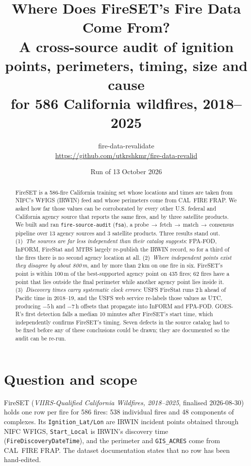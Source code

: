 \documentclass[11pt,a4paper]{article}
\title{\textbf{Where Does FireSET's Fire Data Come From?}\\[4pt]
\large A cross-source audit of ignition points, perimeters, timing, size and cause\\
for 586 California wildfires, 2018--2025}
\author{fire-data-revalidate \\ \small\url{https://github.com/utkrshkmr/fire-data-revalid}}
\date{Run of 13 October 2026}
\begin{document}
\maketitle

\begin{abstract}
\noindent FireSET is a 586-fire California training set whose locations and times are taken from NIFC's WFIGS
(IRWIN) feed and whose perimeters come from CAL~FIRE FRAP. We asked how far those values can be corroborated
by every other U.S. federal and California agency source that reports the same fires, and by three satellite
products. We built and ran \texttt{fire-source-audit} (\texttt{fsa}), a probe\,$\to$\,fetch\,$\to$\,match\,$\to$\,consensus
pipeline over 13 agency sources and 3 satellite products. Three results stand out. (1)~\emph{The sources are
far less independent than their catalog suggests}: FPA-FOD, InFORM, FireStat and MTBS largely re-publish the
IRWIN record, so for a third of the fires there is no second agency location at all. (2)~\emph{Where independent
points exist they disagree by about 800\,m}, and by more than 2\,km on one fire in six. FireSET's point is within
100\,m of the best-supported agency point on 435 fires; 62 fires have a point that lies outside the final
perimeter while another agency point lies inside it. (3)~\emph{Discovery times carry systematic clock errors}:
USFS FireStat runs 2\,h ahead of Pacific time in 2018--19, and the USFS web service re-labels those values as
UTC, producing $-5$\,h and $-7$\,h offsets that propagate into InFORM and FPA-FOD. GOES-R's first detection falls a
median 10 minutes after FireSET's start time, which independently confirms FireSET's timing. Seven defects in the
source catalog had to be fixed before any of these conclusions could be drawn; they are documented so the audit
can be re-run.
\end{abstract}

\tableofcontents
\clearpage

\section{Question and scope}

FireSET (\emph{VIIRS-Qualified California Wildfires, 2018--2025}, finalised 2026-08-30) holds one row per fire
for 586 fires: 538 individual fires and 48 components of complexes. Its \texttt{Ignition\_Lat/Lon} are IRWIN
incident points obtained through NIFC WFIGS, \texttt{Start\_Local} is IRWIN's discovery time
(\texttt{FireDiscoveryDateTime}), and the perimeter and \texttt{GIS\_ACRES} come from CAL~FIRE FRAP. The dataset documentation states that no row
has been hand-edited.
\end{document}
